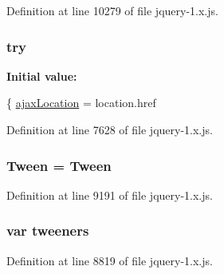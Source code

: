 Definition at line 10279 of file jquery-\/1.\+x.\+js.

\subsubsection[{\texorpdfstring{try}{try}}]{\setlength{\rightskip}{0pt plus 5cm}try}\hypertarget{jquery-1_8x_8js_abe4cc9788f52e49485473dc699537388}{}\label{jquery-1_8x_8js_abe4cc9788f52e49485473dc699537388}
{\bfseries Initial value\+:}
\begin{DoxyCode}
\{
    \hyperlink{jquery-1_8x_8js_a1661d4e1676e7c6ffde5a3cb8d8ae246}{ajaxLocation} = location.href
\end{DoxyCode}


Definition at line 7628 of file jquery-\/1.\+x.\+js.

\subsubsection[{\texorpdfstring{Tween}{Tween}}]{ Tween = Tween}\hypertarget{jquery-1_8x_8js_a91e55267cc469e865a6a7c6cfc51c7b1}{}\label{jquery-1_8x_8js_a91e55267cc469e865a6a7c6cfc51c7b1}


Definition at line 9191 of file jquery-\/1.\+x.\+js.

\subsubsection[{\texorpdfstring{tweeners}{tweeners}}]{\setlength{\rightskip}{0pt plus 5cm}var tweeners}\hypertarget{jquery-1_8x_8js_a948afd2431eec272c99689edddfb6850}{}\label{jquery-1_8x_8js_a948afd2431eec272c99689edddfb6850}


Definition at line 8819 of file jquery-\/1.\+x.\+js.

